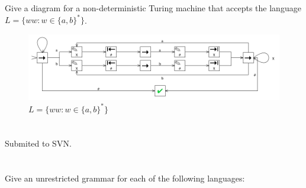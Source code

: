\documentclass[paper=a4, fontsize=11pt]{scrartcl} %
\begin{document}
\maketitle %

\section{}

\begin{fancyquotes}
   Give a diagram for a non-deterministic Turing machine that accepts
   the language $L = \{ww : w\in \{a, b\}^{*}\}$.
\end{fancyquotes}

\begin{figure}[hp]
  \centering
  \includegraphics[width=\textwidth]{7-1.png}
  \caption{$L = \{ww : w\in \{a,b\}^{*}\}$}
\end{figure}

\pagebreak

\section{}

\begin{fancyquotes}
  Submited to SVN.
\end{fancyquotes}

\section{}

\begin{fancyquotes}
  Give an unrestricted grammar for each of the following languages:
\end{fancyquotes}
\end{document}
